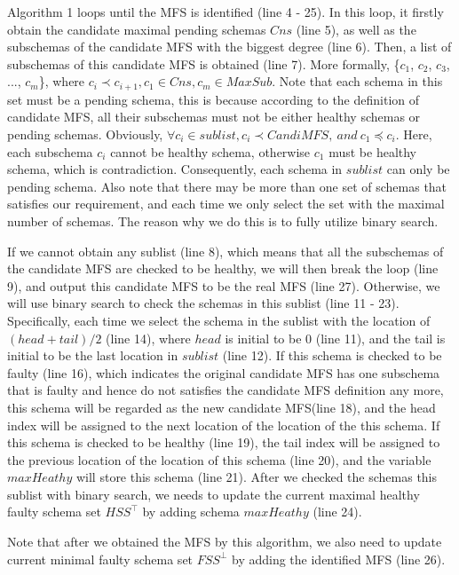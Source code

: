 \documentclass{sig-alternate-05-2015}
\begin{document}
{{Algorithm 1 loops until the MFS is identified (line 4 - 25). In this loop, it firstly obtain the candidate maximal pending schemas $Cns$ (line 5), as well as the subschemas of the candidate MFS with the biggest degree (line 6). Then,  a list of subschemas of this candidate MFS is obtained (line 7). More formally, \{$c_{1}$, $c_{2}$, $c_{3}$, ..., $c_{m}$\}, where $c_{i} \prec c_{i+1}, c_{1} \in Cns, c_{m} \in MaxSub$.  Note that each schema in this set must be a pending schema, this is because according to the definition of candidate MFS, all their subschemas must not be either healthy schemas or pending schemas.  Obviously, $\forall c_{i} \in sublist, c_{i} \prec CandiMFS, \ and\  c_{1} \preceq c_{i}$.  Here, each subschema $c_{i}$ cannot be healthy schema, otherwise $c_{1}$ must be healthy schema, which is contradiction. Consequently, each schema in $sublist$ can only be pending schema. Also note that there may be more than one set of schemas that satisfies our requirement, and each time we only select the set with the maximal number of schemas. The reason why we do this is to fully utilize binary search.

If we cannot obtain any sublist (line 8), which means that all the subschemas of the candidate MFS are checked to be healthy, we will then break the loop (line 9), and output this candidate MFS to be the real MFS (line 27). Otherwise, we will use binary search to check the schemas in this sublist (line 11 - 23). Specifically, each time we select the schema in the sublist with the location of $(head + tail) / 2$ (line 14), where $head$ is initial to be 0 (line 11), and the tail is initial to be the last location in $sublist$ (line 12). If this schema is checked to be faulty (line 16), which indicates the original candidate MFS has one subschema that is faulty and hence do not satisfies the candidate MFS definition any more, this schema will be regarded as the new candidate MFS(line 18), and the head index will be assigned to the next location of the location of the this schema.  If this schema is checked to be healthy (line 19), the tail index will be assigned to the previous location of the location of this schema (line 20), and the variable $maxHeathy$ will store this schema (line 21).  After we checked the schemas this sublist with binary search, we needs to update the current maximal healthy faulty schema set $HSS^{\top}$ by adding schema $maxHeathy$ (line 24).


Note that after we obtained the MFS by this algorithm, we also need to update current minimal faulty schema set $FSS^{\bot}$ by adding the identified MFS (line 26).


}}
\end{document}

